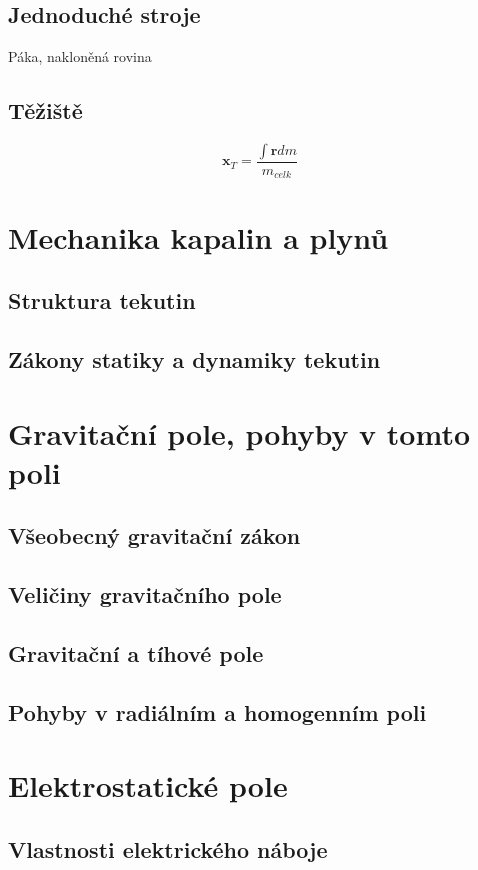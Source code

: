 \documentclass[titlepage]{book}
\begin{document}
\section{Jednoduché stroje}
Páka, nakloněná rovina
\section{Těžiště}
\begin{equation}
\boldsymbol x_T = \frac{\int \boldsymbol r dm}{m_{celk}}
\end{equation}
\chapter{Mechanika kapalin a plynů}

\section{Struktura tekutin}

\section{Zákony statiky a dynamiky tekutin}

\chapter{Gravitační pole, pohyby v tomto poli}
\section{Všeobecný gravitační zákon}
\section{Veličiny gravitačního pole}
\section{Gravitační a tíhové pole}
\section{Pohyby v radiálním a homogenním poli}
\chapter{Elektrostatické pole}
\section{Vlastnosti elektrického náboje}
\end{document}
